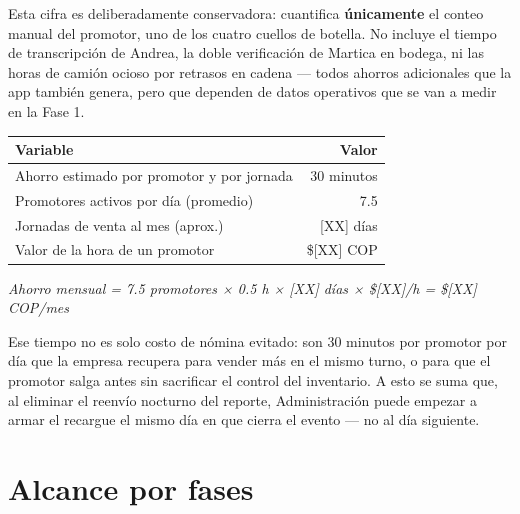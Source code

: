 \documentclass[11pt,a4paper]{article}
\begin{document}
Esta cifra es deliberadamente conservadora: cuantifica \textbf{únicamente} el conteo manual del promotor, uno de los cuatro cuellos de botella. No incluye el tiempo de transcripción de Andrea, la doble verificación de Martica en bodega, ni las horas de camión ocioso por retrasos en cadena --- todos ahorros adicionales que la app también genera, pero que dependen de datos operativos que se van a medir en la Fase 1.

\begin{center}
\begin{tabular}{lr}
\toprule
\textbf{Variable} & \textbf{Valor} \\
\midrule
Ahorro estimado por promotor y por jornada & 30 minutos \\
Promotores activos por día (promedio) & 7.5 \\
Jornadas de venta al mes (aprox.) & [XX] días \\
Valor de la hora de un promotor & \$[XX] COP \\
\bottomrule
\end{tabular}
\end{center}

\begin{center}
\textit{Ahorro mensual = 7.5 promotores × 0.5 h × [XX] días × \$[XX]/h = \$[XX] COP/mes}
\end{center}

Ese tiempo no es solo costo de nómina evitado: son 30 minutos por promotor por día que la empresa recupera para vender más en el mismo turno, o para que el promotor salga antes sin sacrificar el control del inventario. A esto se suma que, al eliminar el reenvío nocturno del reporte, Administración puede empezar a armar el recargue el mismo día en que cierra el evento --- no al día siguiente.

\section{Alcance por fases}

\begin{center}
\end{center}
\end{document}
